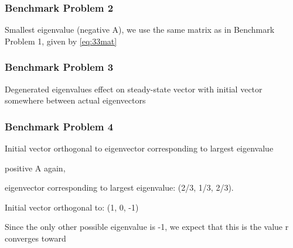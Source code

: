 \subsubsection{Benchmark Problem 2}\label{sec:benchmark problem 2}
Smallest eigenvalue (negative A),
we use the same matrix as in Benchmark Problem 1, given by \autoref{eq:33mat}


\subsubsection{Benchmark Problem 3}\label{sec:benchmark problem 3}
Degenerated eigenvalues effect on steady-state vector with initial vector somewhere between actual eigenvectors

\subsubsection{Benchmark Problem 4}\label{sec:benchmark problem 4}
Initial vector orthogonal to eigenvector corresponding to largest eigenvalue

positive A again, 

eigenvector corresponding to largest eigenvalue: (2/3, 1/3, 2/3).

Initial vector orthogonal to: (1, 0, -1) 

Since the only other possible eigenvalue is -1, we expect that this is the value r converges toward